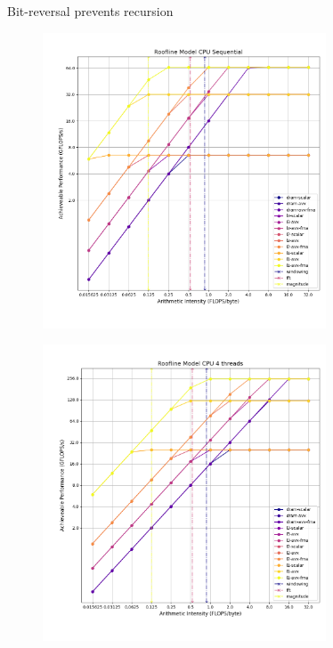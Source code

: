 \documentclass{beamer}
\begin{document}
\begin{frame}{Bit-reversal prevents recursion}
	\endgroup
\end{frame}

\begin{frame}
	\begingroup
	\small
	\begin{figure}
		\includegraphics[width=0.75\textwidth,center]{resources/images/roof-seq-cpu.png}
	\end{figure}
	\endgroup
\end{frame}

\begin{frame}
	\begingroup
	\small
	\begin{figure}
		\includegraphics[width=0.75\textwidth,center]{resources/images/roof-mt4-cpu.png}
	\end{figure}
	\endgroup
\end{frame}
\end{document}
